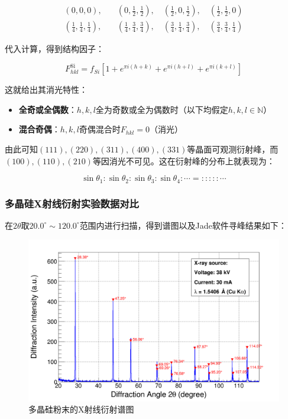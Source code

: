 \documentclass{thuemp}
\begin{document}
\begin{align*}
(0,0,0),\quad &(0,\frac{1}{2},\frac{1}{2}),\quad (\frac{1}{2},0,\frac{1}{2}),\quad (\frac{1}{2},\frac{1}{2},0) \\
(\frac{1}{4},\frac{1}{4},\frac{1}{4}),\quad &(\frac{1}{4},\frac{3}{4},\frac{3}{4}),\quad (\frac{3}{4},\frac{1}{4},\frac{3}{4}),\quad (\frac{3}{4},\frac{3}{4},\frac{1}{4})
\end{align*}

代入计算，得到结构因子：

\begin{equation}
    F_{hkl}^{\text{Si}} = f_{Si} \left[1 + e^{\pi i (h+k)} + e^{\pi i (h+l)} + e^{\pi i (k+l)}\right]
    \label{eq:si_struct_fac}
\end{equation}

这就给出其消光特性：

\begin{itemize}
    \item \textbf{全奇或全偶数}：$h,k,l$全为奇数或全为偶数时（以下均假定$h,k,l \in \mathbb{N}$）
    \begin{itemize}
    \end{itemize}
    \item \textbf{混合奇偶}：$h,k,l$奇偶混合时$F_{hkl}=0$（消光）
\end{itemize}

由此可知$(111), (220), (311), (400), (331)$等晶面可观测衍射峰，而$(100), (110), (210)$等因消光不可见。这在衍射峰的分布上就表现为：

\begin{equation}
    \sin{\theta_1} : \sin{\theta_2} :\sin{\theta_3} : \sin{\theta_4} : \cdots = 
    : : : : : \cdots
\label{eq:si_diff_patt}
\end{equation}

\subsubsection{多晶硅X射线衍射实验数据对比}

在$2\theta$取$20.0^\circ \sim 120.0^\circ$范围内进行扫描，得到谱图以及Jade软件寻峰结果如下：

\begin{figure}[H]
    \centering
    \includegraphics[options]{../Data/Silicon-multi.png}
    \caption{多晶硅粉末的X射线衍射谱图}
    \label{fig:si_xrd}    
\end{figure}
\end{document}
